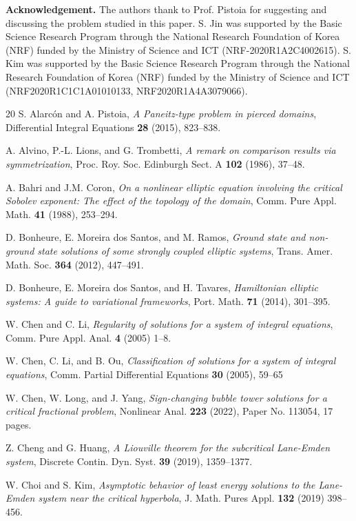 \documentclass[reqno]{amsart}
\theoremstyle{remark}
\renewcommand{\(}{\left(}
\renewcommand{\)}{\right)}
\numberwithin{equation}{section}
\begin{document}
\bigskip \noindent \textbf{Acknowledgement.}
The authors thank to Prof. Pistoia for suggesting and discussing the problem studied in this paper.
S. Jin was supported by the Basic Science Research Program through the National Research Foundation of Korea (NRF) funded by the Ministry of Science and ICT (NRF-2020R1A2C4002615).
S. Kim was supported by the Basic Science Research Program through the National Research Foundation of Korea (NRF) funded by the Ministry of Science and ICT (NRF2020R1C1C1A01010133, NRF2020R1A4A3079066).
\begin{thebibliography}{20}
S. Alarc\'on and A. Pistoia, \textit{A Paneitz-type problem in pierced domains}, Differential Integral Equations \textbf{28} (2015), 823--838.

A. Alvino, P.-L. Lions, and G. Trombetti, \textit{A remark on comparison results via symmetrization}, Proc. Roy. Soc. Edinburgh Sect. A \textbf{102} (1986), 37--48.

A. Bahri and J.M. Coron, \textit{On a nonlinear elliptic equation involving the critical Sobolev exponent: The effect of the topology of the domain}, Comm. Pure Appl. Math. \textbf{41} (1988), 253--294.

D. Bonheure, E. Moreira dos Santos, and M. Ramos, \textit{Ground state and non-ground state solutions of some strongly coupled elliptic systems}, Trans. Amer. Math. Soc. \textbf{364} (2012), 447--491.

D. Bonheure, E. Moreira dos Santos, and H. Tavares, \textit{Hamiltonian elliptic systems: A guide to variational frameworks}, Port. Math. \textbf{71} (2014), 301--395.

W. Chen and C. Li, \textit{Regularity of solutions for a system of integral equations}, Comm. Pure Appl. Anal. \textbf{4} (2005) 1--8.

W. Chen, C. Li, and B. Ou, \textit{Classification of solutions for a system of integral equations}, Comm. Partial Differential Equations \textbf{30} (2005), 59--65

W. Chen, W. Long, and J. Yang, \textit{Sign-changing bubble tower solutions for a critical fractional problem}, Nonlinear Anal. \textbf{223} (2022), Paper No. 113054, 17 pages.

Z. Cheng and G. Huang, \textit{A Liouville theorem for the subcritical Lane-Emden system}, Discrete Contin. Dyn. Syst. \textbf{39} (2019), 1359--1377.

W. Choi and S. Kim, \textit{Asymptotic behavior of least energy solutions to the Lane-Emden system near the critical hyperbola}, J. Math. Pures Appl. \textbf{132} (2019) 398--456.


\end{thebibliography}
\end{document}
